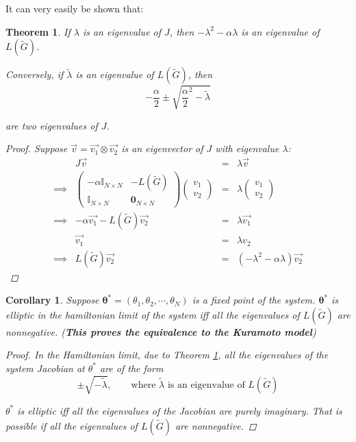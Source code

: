 \documentclass[10pt,aps,pra,twocolumn,superscriptaddress]{revtex4-1}
\newtheorem{theorem}{Theorem}
\newtheorem{corr}{Corollary}
\begin{document}
It can very easily be shown that:
\begin{theorem}
\label{eq-fp-class}
If $\lambda$ is an eigenvalue of $J$, then  $-\lambda^2-\alpha\lambda$ is an 
eigenvalue of $L(\tilde{G})$. 

Conversely, if $\tilde{\lambda}$ is an eigenvalue of $L(\tilde{G})$, then 
\begin{equation}
\label{eq-eigval}
-\frac{\alpha}{2}\pm \sqrt{\frac{\alpha}{2}^{2}-\tilde{\lambda}}
\end{equation}

are two eigenvalues of $J$.  

\begin{proof}
Suppose $\vec{v}=\vec{v_1}\otimes\vec{v_2}$ is an eigenvector of $J$ with eigenvalue $\lambda$:
\begin{align*}
&J\vec{v}&=&\lambda\vec{v}\\
\implies&\left(
\begin{array}{c|c}
-\alpha\mathbb{I}_{N\times N} & -L(\tilde{G})\\
\hline
\mathbb{I}_{N\times N} & \mathbf{0}_{N\times N}
\end{array}
\right) \begin{pmatrix}
v_1\\
v_2
\end{pmatrix} &=&\lambda \begin{pmatrix}
v_1\\
v_2
\end{pmatrix} \\
\implies&-\alpha\vec{v_1}-L(\tilde{G})\vec{v_2}&=&\lambda\vec{v_1}\\
&\vec{v_1}&=&\lambda v_2\\
\implies&L(\tilde{G})\vec{v_2}&=&(-\lambda^2-\alpha\lambda)\vec{v_2}
\end{align*}

\end{proof}
\end{theorem}


\begin{corr}
\label{cor-lapl-jacob-eigval}
Suppose $\mathbf{\theta^*}=(\theta_1,\theta_2,\cdots,\theta_N)$ is a fixed point 
of the system.  $\mathbf{\theta^*}$ is elliptic in the 
hamiltonian limit of the system iff all the eigenvalues of $L(\tilde{G})$ are 
nonnegative.  (\textbf{This proves the equivalence to the Kuramoto model})

\begin{proof}
In the Hamiltonian limit, due to Theorem \ref{eq-fp-class}, all the 
eigenvalues of the system Jacobian at $\theta^*$ are of the form
\[
\pm\sqrt{-\tilde{\lambda}}, \hspace{2em}\text{where } \tilde{\lambda}\text{ is 
an eigenvalue of } L(\tilde{G})
\]

$\theta^*$ is elliptic iff all the eigenvalues of the Jacobian are purely 
imaginary.  That is possible if all the eigenvalues of $L(\tilde{G})$ are 
nonnegative.  
\end{proof}
\end{corr}
\end{document}
